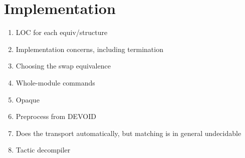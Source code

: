 \section{Implementation}

\begin{enumerate}
\item LOC for each equiv/structure
\item Implementation concerns, including termination
\item Choosing the swap equivalence
\item Whole-module commands
\item Opaque
\item Preprocess from DEVOID
\item Does the transport automatically, but matching is in general undecidable
\item Tactic decompiler
\end{enumerate}
